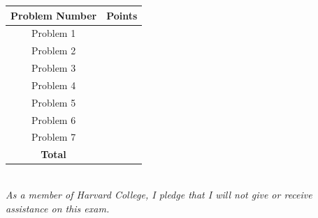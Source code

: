\documentclass{article}
\begin{document}
    \centering
    \begin{tabular}{|c|c|}
    \hline
      \textbf{Problem Number}   & \textbf{Points}  \\
             \hline \hline
                Problem 1   &   \\
            \hline
                 Problem 2 &   \\
        \hline 
                Problem 3 &   \\
        \hline 
                Problem 4 &   \\
        \hline 
                Problem 5 &   \\
        \hline 
         Problem 6 &   \\
        \hline 
         Problem 7 &   \\
        \hline 
    
               
               
         \textbf{Total} &   \\
         \hline 
    \end{tabular}\\
\vspace{0.5in}
\emph{As a member of Harvard College, I pledge that I will not give or receive assistance on this exam.}\\
\\

\newpage
\end{document}
